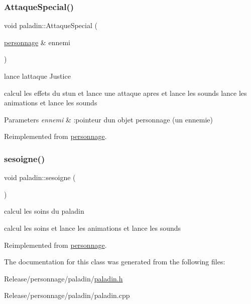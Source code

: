 \subsubsection{\texorpdfstring{Attaque\+Special()}{AttaqueSpecial()}}
{\footnotesize\ttfamily void paladin\+::\+Attaque\+Special (\begin{DoxyParamCaption}\item[{\mbox{\hyperlink{classpersonnage}{personnage}} \&}]{ennemi }\end{DoxyParamCaption})\hspace{0.3cm}{\ttfamily [virtual]}}



lance l\textquotesingle{}attaque Justice 

calcul les effets du stun et lance une attaque apres et lance les sounds lance les animations et lance les sounds


\begin{DoxyParams}{Parameters}
{\em ennemi} & \+:pointeur d\textquotesingle{}un objet personnage (un ennemie) \\
\hline
\end{DoxyParams}


Reimplemented from \mbox{\hyperlink{classpersonnage_ab8f27aff95ffc033fb22d56e549bd415}{personnage}}.

\mbox{\label{classpaladin_af97688ef9f2cc305e9e942818a3916d7}} 
\subsubsection{\texorpdfstring{sesoigne()}{sesoigne()}}
{\footnotesize\ttfamily void paladin\+::sesoigne (\begin{DoxyParamCaption}{ }\end{DoxyParamCaption})\hspace{0.3cm}{\ttfamily [virtual]}}



calcul les soins du paladin 

calcul les soins et lance les animations et lance les sounds 

Reimplemented from \mbox{\hyperlink{classpersonnage_a53539db23cbf909d2c4b025ff2ac2e45}{personnage}}.



The documentation for this class was generated from the following files\+:\begin{DoxyCompactItemize}
\item 
Release/personnage/paladin/\mbox{\hyperlink{paladin_8h}{paladin.\+h}}\item 
Release/personnage/paladin/paladin.\+cpp\end{DoxyCompactItemize}
